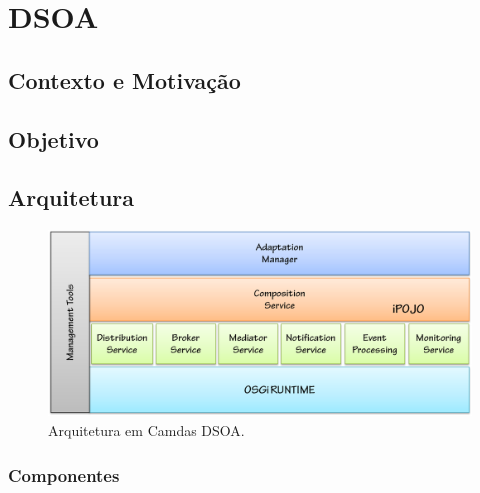 \chapter{DSOA}
\label{ch:3}

\section{Contexto e Motivação}

\section{Objetivo}

\section{Arquitetura}
\label{sec:dsoa_arch}

\begin{figure}[htp]
\centering
\includegraphics[width=13cm]{chapters/chapter3/dsoa-arch.png}
\caption[Arquitetura em Camdas DSOA]{Arquitetura em Camdas DSOA.}
\label{fig:proposal}
\end{figure}

\subsection{Componentes}
